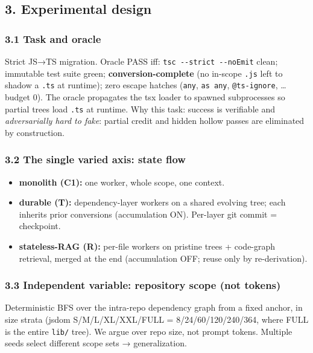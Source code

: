 \documentclass[
  10pt,
]{article}
\providecommand{\tightlist}{%
  \setlength{\itemsep}{0pt}\setlength{\parskip}{0pt}}
\begin{document}
\subsection{3. Experimental design}\label{experimental-design}

\subsubsection{3.1 Task and oracle}\label{task-and-oracle}

Strict JS→TS migration. Oracle PASS iff:
\texttt{tsc\ -\/-strict\ -\/-noEmit} clean; immutable test suite green;
\textbf{conversion-complete} (no in-scope \texttt{.js} left to shadow a
\texttt{.ts} at runtime); zero escape hatches (\texttt{any},
\texttt{as\ any}, \texttt{@ts-ignore}, \ldots{} budget 0). The oracle
propagates the tsx loader to spawned subprocesses so partial trees load
\texttt{.ts} at runtime. Why this task: success is verifiable and
\emph{adversarially hard to fake}: partial credit and hidden hollow
passes are eliminated by construction.

\subsubsection{3.2 The single varied axis: state
flow}\label{the-single-varied-axis-state-flow}

\begin{itemize}
\tightlist
\item
  \textbf{monolith (C1):} one worker, whole scope, one context.
\item
  \textbf{durable (T):} dependency-layer workers on a shared evolving
  tree; each inherits prior conversions (accumulation ON). Per-layer git
  commit = checkpoint.
\item
  \textbf{stateless-RAG (R):} per-file workers on pristine trees +
  code-graph retrieval, merged at the end (accumulation OFF; reuse only
  by re-derivation).
\end{itemize}

\subsubsection{3.3 Independent variable: repository scope (not
tokens)}\label{independent-variable-repository-scope-not-tokens}

Deterministic BFS over the intra-repo dependency graph from a fixed
anchor, in size strata (jsdom S/M/L/XL/XXL/FULL = 8/24/60/120/240/364,
where FULL is the entire \texttt{lib/} tree). We argue over repo size,
not prompt tokens. Multiple seeds select different scope sets →
generalization.
\end{document}
